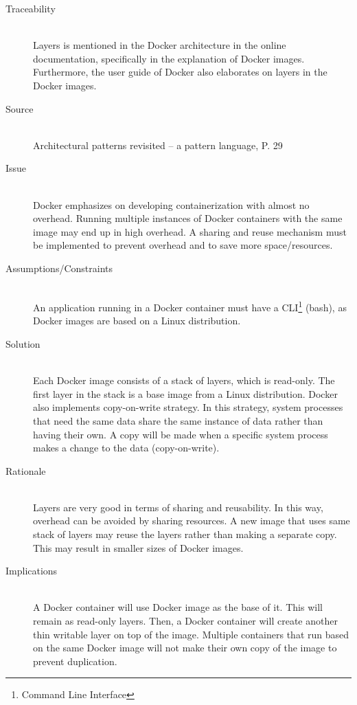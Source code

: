 \begin{description}
\item [Traceability]~\\
Layers is mentioned in the Docker architecture in the online documentation,
specifically in the explanation of Docker images\cite{dockerarchi}. \\
Furthermore, the user guide of Docker also elaborates on layers in the Docker images\cite{dockerimage}.

\item [Source]~\\
Architectural patterns revisited -- a pattern language, P. 29
\cite{avgeriou2005architectural}

\item [Issue]~\\
Docker emphasizes on developing containerization with almost no overhead. Running
multiple instances of Docker containers with the same image may end up in high
overhead. A sharing and reuse mechanism must be implemented to prevent overhead
and to save more space/resources.

\item [Assumptions/Constraints]~\\
An application running in a Docker container must have a CLI\footnote{Command Line
Interface} (bash), as Docker images are based on a Linux distribution.

\item [Solution]~\\
Each Docker image consists of a stack of layers, which is read-only. The first
layer in the stack is a base image from a Linux distribution. Docker also
implements copy-on-write strategy. In this strategy, system processes that need
the same data share the same instance of data rather than having their own. A
copy will be made when a specific system process makes a change to the data (copy-on-write).

\item [Rationale] ~\\
Layers are very good in terms of sharing and reusability. In this way, overhead
can be avoided by sharing resources. A new image that uses same stack of layers
may reuse the layers rather than making a separate copy. This may result in
smaller sizes of Docker images.

\item [Implications]~\\
A Docker container will use Docker image as the base of it. This will remain as
read-only layers. Then, a Docker container will create another thin writable
layer on top of the image. Multiple containers that run based on the same Docker
image will not make their own copy of the image to prevent duplication.


\end{description}
